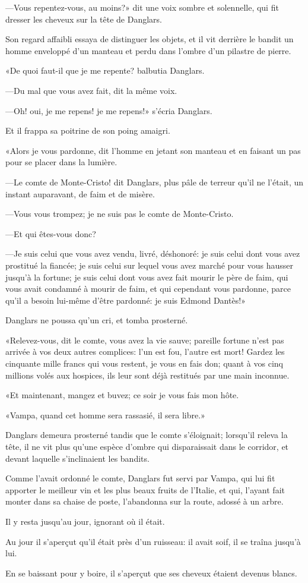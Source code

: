 —Vous repentez-vous, au moins?» dit une voix sombre et solennelle, qui fit dresser les cheveux sur la tête de Danglars. 

Son regard affaibli essaya de distinguer les objets, et il vit derrière le bandit un homme enveloppé d'un manteau et perdu dans l'ombre d'un pilastre de pierre. 

«De quoi faut-il que je me repente? balbutia Danglars. 

—Du mal que vous avez fait, dit la même voix. 

—Oh! oui, je me repens! je me repens!» s'écria Danglars. 

Et il frappa sa poitrine de son poing amaigri. 

«Alors je vous pardonne, dit l'homme en jetant son manteau et en faisant un pas pour se placer dans la lumière. 

—Le comte de Monte-Cristo! dit Danglars, plus pâle de terreur qu'il ne l'était, un instant auparavant, de faim et de misère. 

—Vous vous trompez; je ne suis pas le comte de Monte-Cristo. 

—Et qui êtes-vous donc? 

—Je suis celui que vous avez vendu, livré, déshonoré: je suis celui dont vous avez prostitué la fiancée; je suis celui sur lequel vous avez marché pour vous hausser jusqu'à la fortune; je suis celui dont vous avez fait mourir le père de faim, qui vous avait condamné à mourir de faim, et qui cependant vous pardonne, parce qu'il a besoin lui-même d'être pardonné: je suis Edmond Dantès!» 

Danglars ne poussa qu'un cri, et tomba prosterné. 

«Relevez-vous, dit le comte, vous avez la vie sauve; pareille fortune n'est pas arrivée à vos deux autres complices: l'un est fou, l'autre est mort! Gardez les cinquante mille francs qui vous restent, je vous en fais don; quant à vos cinq millions volés aux hospices, ils leur sont déjà restitués par une main inconnue. 

«Et maintenant, mangez et buvez; ce soir je vous fais mon hôte. 

«Vampa, quand cet homme sera rassasié, il sera libre.» 

Danglars demeura prosterné tandis que le comte s'éloignait; lorsqu'il releva la tête, il ne vit plus qu'une espèce d'ombre qui disparaissait dans le corridor, et devant laquelle s'inclinaient les bandits. 

Comme l'avait ordonné le comte, Danglars fut servi par Vampa, qui lui fit apporter le meilleur vin et les plus beaux fruits de l'Italie, et qui, l'ayant fait monter dans sa chaise de poste, l'abandonna sur la route, adossé à un arbre. 

Il y resta jusqu'au jour, ignorant où il était. 

Au jour il s'aperçut qu'il était près d'un ruisseau: il avait soif, il se traîna jusqu'à lui. 

En se baissant pour y boire, il s'aperçut que ses cheveux étaient devenus blancs. 
